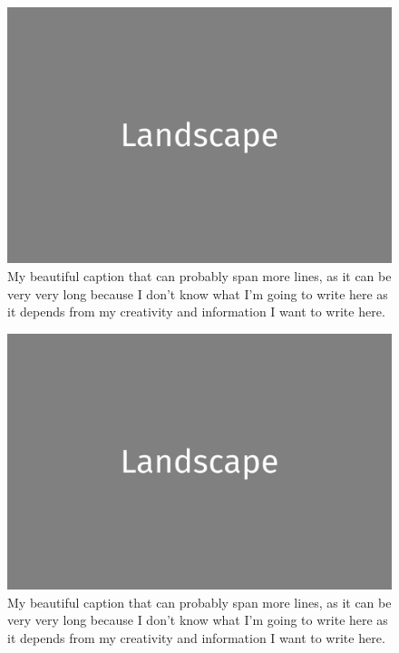 \documentclass[a4paper,twoside]{book}
\begin{document}
\begin{figure}[H]
	\includegraphics[width=\textwidth]{landscape.png}
	\caption{My beautiful caption that can probably span more lines, as it can be very very long because I don't know what I'm going to write here as it depends from my creativity and information I want to write here.}
\end{figure}

\clearpage

\begin{figure}[H]
	\includegraphics[width=\textwidth]{landscape.png}
	\caption{My beautiful caption that can probably span more lines, as it can be very very long because I don't know what I'm going to write here as it depends from my creativity and information I want to write here.}
\end{figure}

\end{document}
